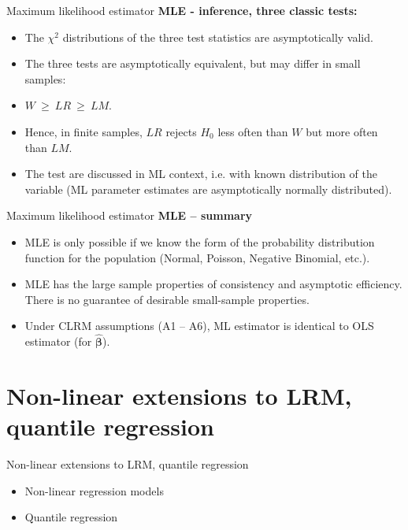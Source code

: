 \documentclass{beamer}
\begin{document}
\begin{frame}{Maximum likelihood estimator}
\textbf{MLE - inference, three classic tests:}\\ \bigskip
\begin{itemize}
    \item The $\chi^2$ distributions of the three test statistics are asymptotically valid.
    \medskip
    \item The three tests are asymptotically equivalent, but may differ in small samples:
    \medskip
    \item $W ~\geq~ \textit{LR}~\geq~ \textit{LM}$.
    \medskip
    \item Hence, in finite samples, $\textit{LR}$ rejects $H_0$ less often than $W$ but more often than $\textit{LM}$.
    \medskip
    \item The test are discussed in ML context, i.e. with known distribution of the variable (ML parameter estimates are asymptotically normally distributed).
    
\end{itemize}
\end{frame}
\begin{frame}{Maximum likelihood estimator}
\textbf{MLE -- summary}\\
\begin{itemize}
\item MLE is only possible if we know the form of the probability distribution function for the population (Normal, Poisson, Negative Binomial, etc.).
\medskip
\item MLE has the large sample properties of consistency and asymptotic efficiency. There is no guarantee of desirable small-sample properties. 
\medskip
\item Under CLRM assumptions (A1 -- A6), ML estimator is identical to OLS estimator (for $\hat{\bm{\beta}}$).
\end{itemize}
\end{frame}
\section{Non-linear extensions to LRM, quantile regression}
\begin{frame}{Non-linear extensions to LRM, quantile regression}
    \bigskip
    \begin{itemize}
        \item Non-linear regression models
        \bigskip
        \item Quantile regression
        
    \end{itemize}
\end{frame}
\end{document}
